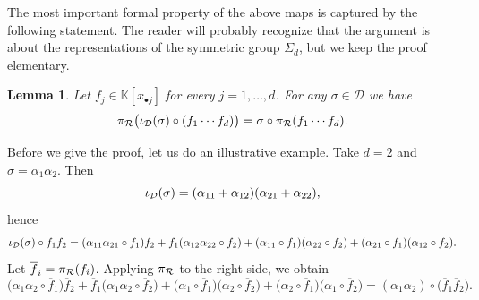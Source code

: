 \documentclass[a4paper,11pt,reqno]{amsart}
\newcommand{\calD}{\mathcal{D}}
\newcommand{\bbK}{\mathbb{K}}
\numberwithin{equation}{section}
\theoremstyle{definition}
\theoremstyle{plain}
\newtheorem{lem}[defn]{Lemma}
\theoremstyle{remark}
\begin{document}
The most important formal property of the above maps is captured by the following
statement. The reader will probably recognize that the argument is about
the representations of the symmetric group $\Sigma_d$, but we keep the proof elementary.
\begin{lem}
\label{lem_projection_apolarity_action}
Let $f_j\in\bbK[x_{\bullet j}]$ for every $j=1,\dots,d$. For any $\sigma\in
\calD$ we have
\[
\projR\bigl(\injD(\sigma)\circ(f_1\cdots f_d)\bigr)=\sigma \circ
\projR(f_1 \cdots  f_d).
\]
\end{lem}
Before we give the proof, let us {do} an illustrative example. {Take} $d = 2$
and $\sigma = \alpha_1\alpha_2$. Then \[\injD(\sigma) = (\alpha_{11} +
\alpha_{12})(\alpha_{21} + \alpha_{22}),\] hence
\[
    \injD(\sigma) \circ f_1f_2 = (\alpha_{11}\alpha_{21}\circ f_1)f_2 +
    f_1(\alpha_{12}\alpha_{22}\circ f_2) + (\alpha_{11}\circ
    f_1)(\alpha_{22}\circ f_2) + (\alpha_{21}\circ f_1) (\alpha_{12}\circ f_2).
\]
\newcommand{\barf}{\overline{f}}%
Let $\barf_i = \projR(f_i)$.
Applying $\pi_{\mathcal{R}}$ to the right side, we obtain
\[
    \bigl(\alpha_{1}\alpha_{2}\circ \barf_1\bigr)\barf_2 +
    \barf_1\bigl(\alpha_{1}\alpha_{2}\circ \barf_2\bigr) + \bigl(\alpha_{1}\circ
    \barf_1\bigr)\bigl(\alpha_{2}\circ \barf_2\bigr) + \bigl(\alpha_{2}\circ \barf_1\bigr)
    \bigl(\alpha_{1}\circ \barf_2\bigr) = (\alpha_1\alpha_2)\circ\bigl(\barf_1\barf_2\bigr).
\]
\end{document}
